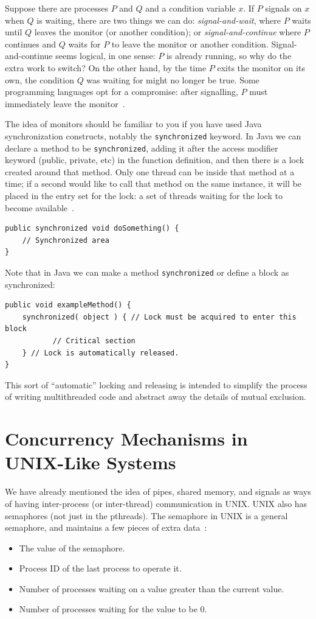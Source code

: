 Suppose there are processes $P$ and $Q$ and a condition variable $x$. If $P$ signals on $x$ when $Q$ is waiting, there are two things we can do: \textit{signal-and-wait}, where $P$ waits until $Q$ leaves the monitor (or another condition); or \textit{signal-and-continue} where $P$ continues and $Q$ waits for $P$ to leave the monitor or another condition. Signal-and-continue seems logical, in one sense: $P$ is already running, so why do the extra work to switch? On the other hand, by the time $P$ exits the monitor on its own, the condition $Q$ was waiting for might no longer be true. Some programming languages opt for a compromise: after signalling, $P$ must immediately leave the monitor~\cite{osc}.

The idea of monitors should be familiar to you if you have used Java synchronization constructs, notably the \texttt{synchronized} keyword. In Java we can declare a method to be \texttt{synchronized}, adding it after the access modifier keyword (public, private, etc) in the function definition, and then there is a lock created around that method. Only one thread can be inside that method at a time; if a second would like to call that method on the same instance, it will be placed in the entry set for the lock: a set of threads waiting for the lock to become available~\cite{osc}. 

\begin{verbatim}
public synchronized void doSomething() {
    // Synchronized area
}
\end{verbatim}


Note that in Java we can make a method \texttt{synchronized} or define a block as synchronized:

\begin{verbatim}
public void exampleMethod() {
    synchronized( object ) { // Lock must be acquired to enter this block
           // Critical section 
    } // Lock is automatically released.
}
\end{verbatim}

This sort of ``automatic'' locking and releasing is intended to simplify the process of writing multithreaded code and abstract away the details of mutual exclusion.

\section*{Concurrency Mechanisms in UNIX-Like Systems}

We have already mentioned the idea of pipes, shared memory, and signals as ways of having inter-process (or inter-thread) communication in UNIX. UNIX also has semaphores (not just in the pthreads). The semaphore in UNIX is a general semaphore, and maintains a few pieces of extra data~\cite{osi}:
\begin{itemize}
    \item The value of the semaphore.
    \item Process ID of the last process to operate it.
    \item Number of processes waiting on a value greater than the current value.
    \item Number of processes waiting for the value to be 0.
\end{itemize}

